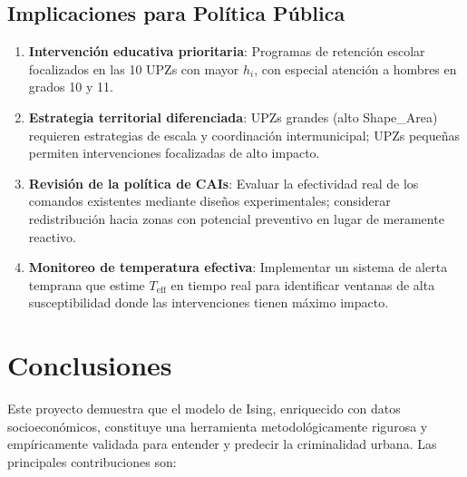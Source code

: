 \documentclass[12pt,a4paper]{article}
\begin{document}
\subsection{Implicaciones para Política Pública}
\begin{enumerate}[label=\alph*)]
    \item \textbf{Intervención educativa prioritaria}: Programas de retención escolar focalizados en las 10 UPZs con mayor $h_i$, con especial atención a hombres en grados 10 y 11.
    \item \textbf{Estrategia territorial diferenciada}: UPZs grandes (alto Shape\_Area) requieren estrategias de escala y coordinación intermunicipal; UPZs pequeñas permiten intervenciones focalizadas de alto impacto.
    \item \textbf{Revisión de la política de CAIs}: Evaluar la efectividad real de los comandos existentes mediante diseños experimentales; considerar redistribución hacia zonas con potencial preventivo en lugar de meramente reactivo.
    \item \textbf{Monitoreo de temperatura efectiva}: Implementar un sistema de alerta temprana que estime $T_{\text{eff}}$ en tiempo real para identificar ventanas de alta susceptibilidad donde las intervenciones tienen máximo impacto.
\end{enumerate}

\section{Conclusiones}

Este proyecto demuestra que el modelo de Ising, enriquecido con datos socioeconómicos, constituye una herramienta metodológicamente rigurosa y empíricamente validada para entender y predecir la criminalidad urbana. Las principales contribuciones son:
\end{document}
